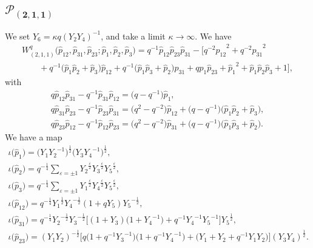 \documentclass[10pt,a4paper]{amsart}
\numberwithin{equation}{section}
\begin{document}
\subsection[$\mathcal{P}_{(2,1,1)}$]{$\boldsymbol{\mathcal{P}_{(2,1,1)}}$}
We set $Y_6 = \kappa q ( Y_2 Y_4)^{-1}$, and take a limit $\kappa \to \infty$. We have
\begin{gather*}
 W^q_{(2,1,1)}\big(\hat{p}_{12}, \hat{p}_{31}, \hat{p}_{23} ; \hat{p}_1, \hat{p}_2, \hat{p}_3\big) = q^{-1} \hat{p}_{12} \hat{p}_{23} \hat{p}_{31} - \bigl[ q^{-2} {\hat{p}_{12}}^{2} + q^{-2} {\hat{p}_{31}}^{2} \\
 \qquad {} + q^{-1} \big( \hat{p}_1 \hat{p}_2 + \hat{p}_3 \big) \hat{p}_{12} + q^{-1} \big( \hat{p}_1 \hat{p}_3 + \hat{p}_2 \big) \hat{p}_{31} + q \hat{p}_1 \hat{p}_{23} + {\hat{p}_1}^{2} +
 \hat{p}_1 \hat{p}_2 \hat{p}_3 + 1 \bigr],
\end{gather*}
with
\begin{gather*}
 q \hat{p}_{12} \hat{p}_{31} -q^{-1} \hat{p}_{31} \hat{p}_{12} = \big( q - q^{-1} \big) \hat{p}_1 , \\
 q \hat{p}_{31} \hat{p}_{23} -q^{-1} \hat{p}_{23} \hat{p}_{31} = \big(q^2 - q^{-2}\big) \hat{p}_{12} + \big( q - q^{-1} \big) \big( \hat{p}_1 \hat{p}_2 + \hat{p}_3 \big), \\
 q \hat{p}_{23} \hat{p}_{12} -q^{-1} \hat{p}_{12} \hat{p}_{23} = \big( q^2 - q^{-2} \big) \hat{p}_{31} + \big( q - q^{-1} \big) \big( \hat{p}_1 \hat{p}_3 + \hat{p}_2 \big) .
\end{gather*}
We have a map
\begin{gather}
 \iota \big(\hat{p}_1\big) = \big( Y_1 {Y_2}^{-1} \big)^{\frac{1}{2}} \big( Y_3 {Y_4}^{-1} \big)^{\frac{1}{2}},\nonumber \\
 \iota\big(\hat{p}_2\big) = q^{-\frac{1}{4}} \sum_{\varepsilon=\pm 1} {Y_2}^{\frac{\varepsilon}{2}} {Y_3}^{\frac{\varepsilon}{2}} {Y_5}^{\frac{\varepsilon}{2}} ,\nonumber \\
\iota\big(\hat{p}_3\big) = q^{-\frac{1}{4}} \sum_{\varepsilon=\pm 1} {Y_1}^{\frac{\varepsilon}{2}} {Y_4}^{\frac{\varepsilon}{2}} {Y_5}^{\frac{\varepsilon}{2}} ,\nonumber \\
 \iota\big(\hat{p}_{12}\big) = q^{-\frac{1}{4}} {Y_1}^{\frac{1}{2}} {Y_4}^{-\frac{1}{2}} ( 1 + q Y_5 ) {Y_5}^{-\frac{1}{2}} ,\nonumber \\
 \iota\big(\hat{p}_{31}\big) = q^{-\frac{1}{4}} {Y_2}^{-\frac{1}{2}} {Y_3}^{-\frac{1}{2}} \big[ ( 1+Y_3) \big( 1+{Y_4}^{-1} \big) + q^{-1} {Y_4}^{-1} {Y_5}^{-1} \big] {Y_5}^{\frac{1}{2}} ,\nonumber \\
 \iota\big(\hat{p}_{23}\big) = ( Y_1 Y_2 )^{-\frac{1}{2}} \big[ q \big( 1 + q^{-1} {Y_3}^{-1} \big) \big( 1+q^{-1} {Y_4}^{-1} \big) + \big( Y_1 + Y_2 + q^{-1} Y_1 Y_2 \big) \big] ( Y_3 Y_4 )^{\frac{1}{2}} . \label{q_P211}
\end{gather}
\end{document}
